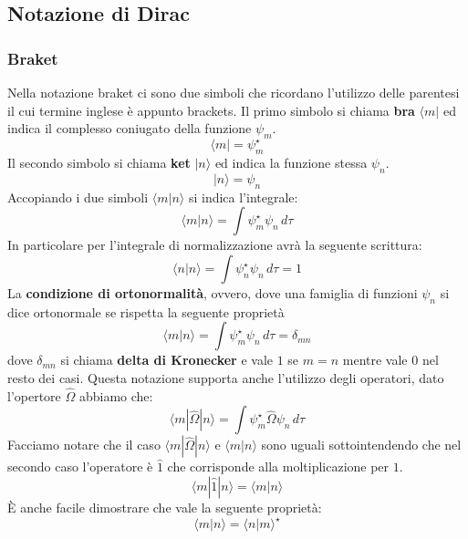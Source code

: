 \subsection{Notazione di Dirac}
\subsubsection{Braket}
Nella notazione braket ci sono due simboli che ricordano l'utilizzo delle parentesi il cui termine inglese è appunto brackets. Il primo simbolo si chiama \textbf{bra} $\langle m |$ ed indica il complesso coniugato della funzione $\psi_m$.
$$\langle m | = \psi_m^{\star}$$
Il secondo simbolo si chiama \textbf{ket} $| n \rangle$ ed indica la funzione stessa $\psi_n$.
$$| n \rangle = \psi_n$$
Accopiando i due simboli $\langle m | n \rangle$ si indica l'integrale:
$$\langle m | n \rangle = \int \psi_m^{\star} \psi_n\, d\tau$$
In particolare per l'integrale di normalizzazione avrà la seguente scrittura:
$$\langle n | n \rangle = \int \psi_n^{\star} \psi_n\, d\tau = 1$$
La \textbf{condizione di ortonormalità}, ovvero, dove una famiglia di funzioni $\psi_n$ si dice ortonormale se rispetta la seguente proprietà
$$\langle m | n \rangle = \int \psi_m^{\star} \psi_n\, d\tau = \delta_{mn}$$
dove $\delta_{mn}$ si chiama \textbf{delta di Kronecker} e vale $1$ se $m = n$ mentre vale $0$ nel resto dei casi.
Questa notazione supporta anche l'utilizzo degli operatori, dato l'opertore $\hat{\Omega}$ abbiamo che:
$$\langle m | \hat{\Omega} | n \rangle = \int \psi_m^{\star} \hat{\Omega} \psi_n\, d\tau$$
Facciamo notare che il caso $\langle m | \hat{\Omega} | n \rangle$ e $\langle m | n \rangle$ sono uguali sottointendendo che nel secondo caso l'operatore è $\hat{1}$ che corrisponde alla moltiplicazione per $1$.
$$\langle m | \hat{1} | n \rangle = \langle m | n \rangle$$
È anche facile dimostrare che vale la seguente proprietà:
$$\langle m | n \rangle = {\langle n | m \rangle}^{\star}$$
